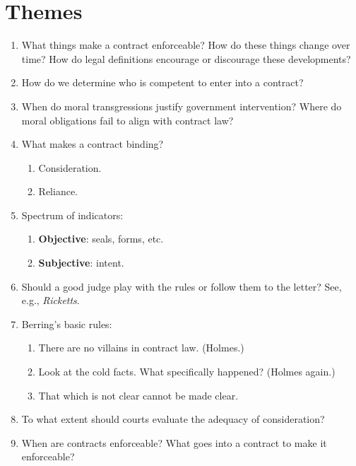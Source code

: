 \section{Themes}

\begin{enumerate}
    \item What things make a contract enforceable? How do these things change 
    over time? How do legal definitions encourage or discourage these 
    developments?
    \item How do we determine who is competent to enter into a contract?
    \item When do moral transgressions justify government intervention? Where 
    do moral obligations fail to align with contract law?
    \item What makes a contract binding?
    \begin{enumerate}
        \item Consideration.
        \item Reliance.
    \end{enumerate}
    \item Spectrum of indicators:
    \begin{enumerate}
        \item \textbf{Objective}: seals, forms, etc.
        \item \textbf{Subjective}: intent.
    \end{enumerate}
    \item Should a good judge play with the rules or follow them to the 
    letter? See, e.g., \emph{Ricketts}.
    \item Berring's basic rules:
    \begin{enumerate}
        \item There are no villains in contract law. (Holmes.)
        \item Look at the cold facts. What specifically happened? (Holmes 
        again.)
        \item That which is not clear cannot be made clear.
    \end{enumerate}
    \item To what extent should courts evaluate the adequacy of consideration?
    \item When are contracts enforceable? What goes into a contract to make it 
    enforceable?
\end{enumerate}
